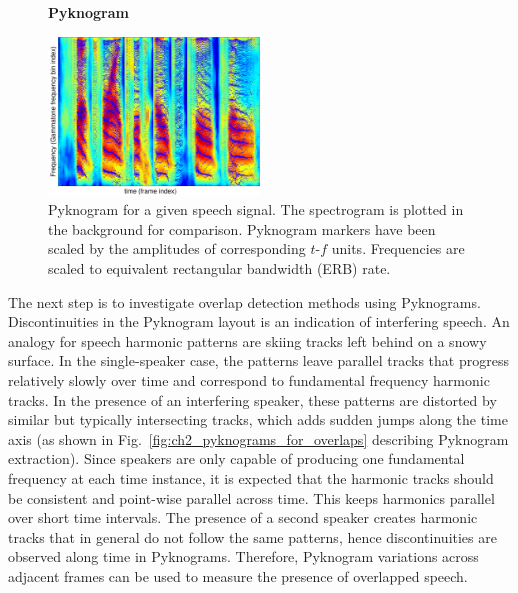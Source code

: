 {\begin{figure}[h!]
	\centering
	\vspace{4mm}
	\textbf{Pyknogram}\par\medskip
	\includegraphics[height =2.in, width=0.5\textwidth]{figures/pyknogram_vs_spectrogram}
	\vspace{-1mm}
	\caption{ Pyknogram for a given speech signal. The spectrogram is plotted in the background for comparison. Pyknogram markers have been scaled by the amplitudes of corresponding $t$-$f$ units. Frequencies are scaled to equivalent rectangular bandwidth (ERB) rate.}
	\vspace{-1mm}
	\label{fig:ch2_pyknograms}
\end{figure}

The next step is to investigate overlap detection methods using Pyknograms.
Discontinuities in the Pyknogram layout is an indication of interfering speech. 
An analogy for speech harmonic patterns are skiing tracks left behind on a snowy surface. 
In the single-speaker case, the patterns leave parallel tracks that progress relatively slowly over time and correspond to fundamental frequency harmonic tracks. 
In the presence of an interfering speaker, these patterns are distorted by similar but typically intersecting tracks, which adds sudden jumps along the time axis (as shown in Fig.~\ref{fig:ch2_pyknograms_for_overlaps} describing Pyknogram extraction). 
Since speakers are only capable of producing one fundamental frequency at each time instance, it is expected that the harmonic tracks should be consistent and point-wise parallel across time. 
This keeps harmonics parallel over short time intervals.   
The presence of a second speaker creates harmonic tracks that in general do not follow the same patterns, hence discontinuities are observed along time in Pyknograms. Therefore, Pyknogram variations across adjacent frames can be used to measure the presence of overlapped speech.

}
